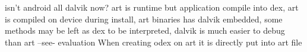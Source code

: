 isn't android all dalvik now?
art is runtime but application compile into dex, art is compiled on device during install, art binaries has dalvik embedded, some methods may be left as dex to be interpreted, dalvik is much easier to debug than art --see- evaluation \newline
\cite{andevconDalvikART}
%
When creating odex on art it is directly put into art file

